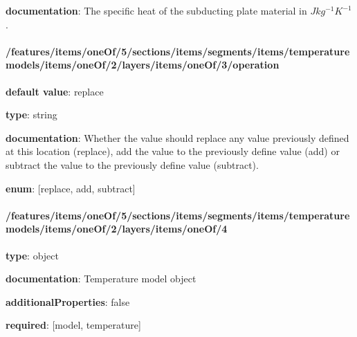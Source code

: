 \begin{itemized}
\item {\bf documentation}: The specific heat of the subducting plate material in $J kg^{-1} K^{-1}$.
\end{itemized}\paragraph{/features/items/oneOf/5/sections/items/segments/items/temperature models/items/oneOf/2/layers/items/oneOf/3/operation} \begin{itemized}
\item {\bf default value}: replace
\item {\bf type}: string
\item {\bf documentation}: Whether the value should replace any value previously defined at this location (replace), add the value to the previously define value (add) or subtract the value to the previously define value (subtract).
\item {\bf enum}: [replace, add, subtract]\end{itemized}\paragraph{/features/items/oneOf/5/sections/items/segments/items/temperature models/items/oneOf/2/layers/items/oneOf/4} \begin{itemized}
\item {\bf type}: object
\item {\bf documentation}: Temperature model object
\item {\bf additionalProperties}: false
\item {\bf required}: [model, temperature]\end{itemized}
